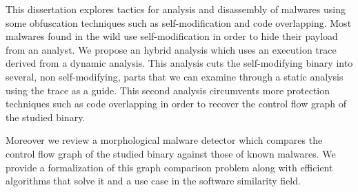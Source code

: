 This dissertation explores tactics for analysis and disassembly of malwares using some obfuscation techniques such as self-modification and code overlapping.
Most malwares found in the wild use self-modification in order to hide their payload from an analyst.
We propose an hybrid analysis which uses an execution trace derived from a dynamic analysis.
This analysis cuts the self-modifying binary into several, non self-modifying, parts that we can examine through a static analysis using the trace as a guide.
This second analysis circumvents more protection techniques such as code overlapping in order to recover the control flow graph of the studied binary.

Moreover we review a morphological malware detector which compares the control flow graph of the studied binary against those of known malwares.
We provide a formalization of this graph comparison problem along with efficient algorithms that solve it and a use case in the software similarity field.